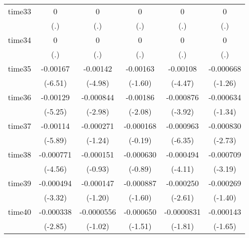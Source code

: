 \begin{table}[htbp]
\begin{tabular}{l*{5}{c}}
time33      &           0         &           0         &           0         &           0         &           0         \\
            &         (.)         &         (.)         &         (.)         &         (.)         &         (.)         \\
time34      &           0         &           0         &           0         &           0         &           0         \\
            &         (.)         &         (.)         &         (.)         &         (.)         &         (.)         \\
time35      &    -0.00167\sym{***}&    -0.00142\sym{***}&    -0.00163         &    -0.00108\sym{***}&   -0.000668         \\
            &     (-6.51)         &     (-4.98)         &     (-1.60)         &     (-4.47)         &     (-1.26)         \\
time36      &    -0.00129\sym{***}&   -0.000844\sym{**} &    -0.00186\sym{*}  &   -0.000876\sym{***}&   -0.000634         \\
            &     (-5.25)         &     (-2.98)         &     (-2.08)         &     (-3.92)         &     (-1.34)         \\
time37      &    -0.00114\sym{***}&   -0.000271         &   -0.000168         &   -0.000963\sym{***}&   -0.000830\sym{**} \\
            &     (-5.89)         &     (-1.24)         &     (-0.19)         &     (-6.35)         &     (-2.73)         \\
time38      &   -0.000771\sym{***}&   -0.000151         &   -0.000630         &   -0.000494\sym{***}&   -0.000709\sym{**} \\
            &     (-4.56)         &     (-0.93)         &     (-0.89)         &     (-4.11)         &     (-3.19)         \\
time39      &   -0.000494\sym{***}&   -0.000147         &   -0.000887         &   -0.000250\sym{**} &   -0.000269         \\
            &     (-3.32)         &     (-1.20)         &     (-1.60)         &     (-2.61)         &     (-1.40)         \\
time40      &   -0.000338\sym{**} &  -0.0000556         &   -0.000650         &  -0.0000831         &   -0.000143         \\
            &     (-2.85)         &     (-1.02)         &     (-1.51)         &     (-1.81)         &     (-1.65)         \\

\end{tabular}
\end{table}
